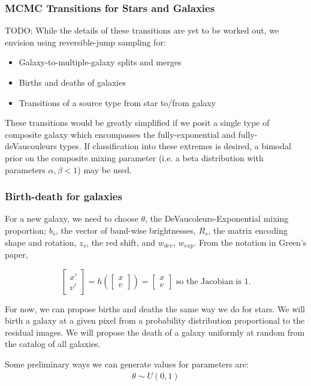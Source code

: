 \documentclass[11pt]{article}
\begin{document}
\subsubsection{MCMC Transitions for Stars and Galaxies}

TODO: While the details of these transitions are yet to be worked
out, we envision using reversible-jump sampling for:
\begin{itemize}
\item Galaxy-to-multiple-galaxy splits and merges
\item Births and deaths of galaxies
\item Transitions of a source type from star to/from galaxy
\end{itemize}
These transitions would be greatly simplified if we posit a single
type of composite galaxy which encompasses the fully-exponential and
fully-deVaucouleurs types. If classification into these extremes is
desired, a bimodal prior on the composite mixing parameter (i.e. a
beta distribution with parameters $\alpha,\beta<1$) may be used.%

\subsubsection{Birth-death for galaxies}

For a new galaxy, we need to choose $\theta$, the DeVaucoleurs-Exponential
mixing proportion; $b_s$, the vector of band-wise brightnesses,
$R_s$, the matrix encoding shape and rotation, $z_s$, the red shift,
and $w_{dev}$, $w_{exp}$.
From the notation in Green's paper,

\[
\begin{bmatrix}x'\\
v'
\end{bmatrix}=h\left(\begin{bmatrix}x\\
v
\end{bmatrix}\right)=\begin{bmatrix}x\\
v
\end{bmatrix}\mbox{ so the Jacobian is }1.
\]

For now, we can propose births and deaths the same
way we do for stars. We will birth a galaxy at a given pixel
from a probability distribution
proportional to the residual images. We will propose
the death of a galaxy uniformly at random from the catalog
of all galaxies.

Some preliminary ways we can generate values for parameters are:
\begin{align*}
\theta \sim U(0, 1)
\end{align*}
\end{document}
